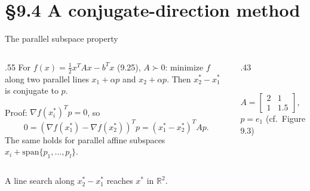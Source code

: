 \documentclass[12pt,aspectratio=169]{beamer}
\newcommand{\R}{\mathbb{R}}
\begin{document}
\section{\S9.4 A conjugate-direction method}

\begin{frame}{The parallel subspace property}
  \begin{columns}[c]
    \begin{column}{.55\textwidth}
      For $f(x)=\tfrac12x^TAx-b^Tx$ (9.25), $A\succ0$:
      minimize $f$ along two parallel lines $x_1+\alpha p$ and $x_2+\alpha p$.
      Then $x_2^*-x_1^*$ is \alert{conjugate to $p$}.

      \vspace{1ex}
      Proof: $\nabla f(x_i^*)^Tp=0$, so
      \begin{equation}
        0 = (\nabla f(x_1^*)-\nabla f(x_2^*))^Tp = (x_1^*-x_2^*)^TAp. \tag{9.26}
      \end{equation}
      The same holds for parallel affine subspaces $x_i+\mathrm{span}\{p_1,\dots,p_l\}$.
    \end{column}
    \begin{column}{.43\textwidth}
      \centering
      \\[.5ex]
      $A=\begin{bmatrix}2&1\\1&1.5\end{bmatrix}$, $p=e_1$ (cf.\ Figure 9.3)
    \end{column}
  \end{columns}
  \vspace{1ex}
  A line search along $x_2^*-x_1^*$ reaches $x^*$ in $\R^2$.
\end{frame}
\end{document}
